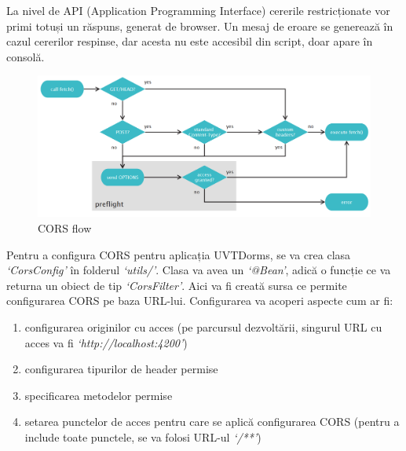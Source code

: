 \documentclass[12pt,a4paper]{report}
\theoremstyle{definition}
\theoremstyle{remark}
\begin{document}
\par La nivel de API (Application Programming Interface) cererile restricționate vor primi totuși un răspuns, generat de browser. Un mesaj de eroare se generează în cazul cererilor respinse, dar acesta nu este accesibil din script, doar apare în consolă.

\begin{figure}[H]
    \centering
    \includegraphics[width=1\linewidth]{resurse/diagrame/diagrama_cors.png}
    \caption{CORS flow\cite{gibbinscross}}
\end{figure}

\par Pentru a configura CORS pentru aplicația UVTDorms, se va crea clasa \textit{`CorsConfig'} în folderul \textit{`utils/'}. Clasa va avea un \textit{`@Bean'}, adică o funcție ce va returna un obiect de tip \textit{`CorsFilter'}. Aici va fi creată sursa ce permite configurarea CORS pe baza URL-lui. Configurarea va acoperi aspecte cum ar fi:

\begin{enumerate}
    \item configurarea originilor cu acces (pe parcursul dezvoltării, singurul URL cu acces va fi \textit{`http://localhost:4200'})
    \item configurarea tipurilor de header permise
    \item specificarea metodelor permise
    \item setarea punctelor de acces pentru care se aplică configurarea CORS (pentru a include toate punctele, se va folosi URL-ul \textit{`/**'})
\end{enumerate}
\end{document}
